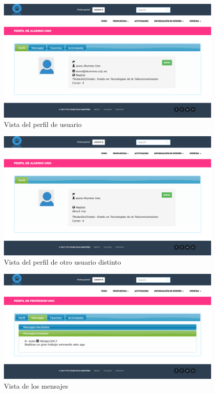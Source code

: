  \begin{figure}[H]
    \centering
    \includegraphics[width=12cm]{img/mi_perfil}
    \caption{Vista del perfil de usuario}
    \label{figura:perfil_usuario}
\end{figure}
\begin{figure}[H]
 \centering
 \includegraphics[width=12cm]{img/perfil_otro}
 \caption{Vista del perfil de otro usuario distinto}
 \label{figura:perfil_otro_usuario}
\end{figure}
\begin{figure}[H]
  \centering
  \includegraphics[width=12cm]{img/perfil_mensajes}
  \caption{Vista de los mensajes}
  \label{figura:perfil_mensajes}
\end{figure}
